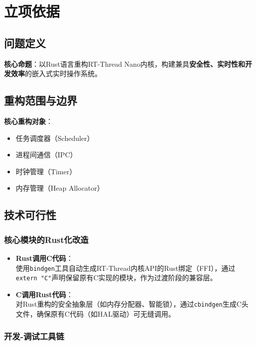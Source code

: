 \section{立项依据}

\subsection{问题定义}

\textbf{核心命题}：以Rust语言重构RT-Thread Nano内核，构建兼具\textbf{安全性、实时性和开发效率}的嵌入式实时操作系统。

\subsection{重构范围与边界}

\textbf{核心重构对象}：

\begin{itemize}
    \item 任务调度器（Scheduler）
    \item 进程间通信（IPC）
    \item 时钟管理（Timer）
    \item 内存管理（Heap Allocator）
\end{itemize}

\subsection{技术可行性}

\subsubsection{核心模块的Rust化改造}

\begin{itemize}
    \item \textbf{Rust调用C代码}：\\使用\texttt{bindgen}工具自动生成RT-Thread内核API的Rust绑定（FFI），通过\texttt{extern "C"}声明保留原有C实现的模块，作为过渡阶段的兼容层。
    \item \textbf{C调用Rust代码}：\\对Rust重构的安全抽象层（如内存分配器、智能锁），通过\texttt{cbindgen}生成C头文件，确保原有C代码（如HAL驱动）可无缝调用。
\end{itemize}


\subsubsection{开发-调试工具链}

